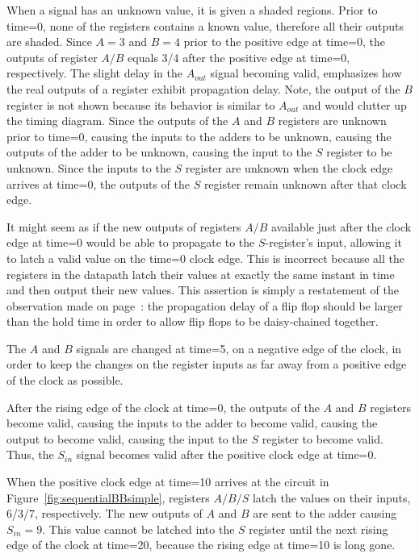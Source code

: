When a signal has an unknown value, it is given a shaded regions.  Prior to 
time=0, none of the registers contains a known value, therefore all 
their outputs are shaded.  Since $A=3$ and $B=4$ prior to the 
positive edge at time=0, the outputs of register $A/B$ equals 3/4 
after the positive edge at time=0, respectively. The slight delay 
in the $A_{out}$ signal becoming valid, emphasizes how the 
real outputs of a register exhibit propagation delay. Note, the output of the
$B$ register is not shown because its behavior is similar to $A_{out}$ and
would clutter up the timing diagram.  Since the outputs of the $A$ and $B$ 
registers are unknown prior to time=0, causing the 
inputs to the adders to be unknown, causing the outputs of the 
adder to be unknown, causing the input to the $S$ register to be 
unknown.  Since the inputs to the $S$ 
register are unknown when the clock edge arrives at time=0, the outputs of the
$S$ register remain unknown after that clock edge.  

It might seem as if the new outputs of registers $A/B$ available 
just after the clock edge at time=0 would be able to propagate 
to the $S$-register's input, allowing it to latch a valid value 
on the time=0 clock edge.  This is incorrect because all the
registers in the datapath latch their values at exactly the same 
instant in time and then output their new values.  This assertion 
is simply a restatement of the observation made on 
page~\pageref{page:FFdelay}: the propagation delay of a flip flop 
should be larger than the hold time in order to allow flip flops 
to be daisy-chained together.

The $A$ and $B$ signals are changed at time=5, on a negative edge 
of the clock, in order to keep the changes on the register inputs 
as far away from a positive edge of the clock as possible.

After the rising edge of the clock at time=0, the outputs of the 
$A$ and $B$ registers become valid, causing the inputs to the adder 
to become valid, causing the output to become valid, causing the 
input to the $S$ register to become valid.  Thus, the $S_{in}$ 
signal becomes valid after the positive clock edge at time=0.

When the positive clock edge at time=10 arrives at the circuit in 
Figure~\ref{fig:sequentialBBsimple}, registers $A/B/S$ latch the values on their 
inputs, 6/3/7, respectively.  The new outputs of $A$ and $B$ are 
sent to the adder causing $S_{in} = 9$.  This value cannot be 
latched into the $S$ register until the next rising edge of the 
clock at time=20, because the rising edge at time=10 is long gone.

